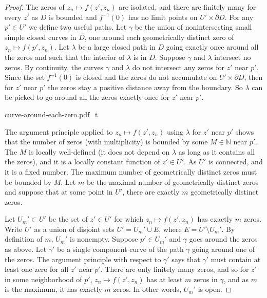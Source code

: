 \documentclass[12pt,openany]{book}
\newcommand{\N}{{\mathbb{N}}}
\theoremstyle{plain}
\theoremstyle{remark}
\theoremstyle{definition}
\newenvironment{myfig}{%
    \begin{center}
}{%
    \end{center}
}
\theoremstyle{exercise}
\theoremstyle{example}
\begin{document}
\begin{proof}
The zeros of $z_n \mapsto f(z',z_n)$ are isolated, and there are finitely
many for every $z'$ as $D$ is bounded and $f^{-1}(0)$ has no limit points on
$U' \times \partial D$.
For any $p' \in U'$ we define two useful paths.
Let $\gamma$ be the union of nonintersecting
small simple closed curves
in $D$, one around each geometrically distinct zero of $z_n \mapsto f(p',z_n)$.
Let $\lambda$ be a large closed path in $D$ going 
exactly once around all the zeros and such that the interior of $\lambda$ is
in $D$.  Suppose $\gamma$ and $\lambda$
intersect no zeros.
By continuity,
the curves $\gamma$
and $\lambda$ do not intersect any zeros for $z'$ near $p'$.
Since the set $f^{-1}(0)$ is closed and the zeros
do not
accumulate on $U' \times \partial D$,
then
for $z'$ near $p'$ the zeros stay a positive distance away from
the boundary.  So $\lambda$ can be picked to go 
around all
the zeros exactly once for $z'$ near $p'$.

\begin{myfig}
{curve-around-each-zero.pdf_t}
\end{myfig}

The argument principle applied to $z_n \mapsto f(z',z_n)$ using $\lambda$ for $z'$ near
$p'$ shows that the number of zeros (with multiplicity) is bounded by some $M \in \N$
near $p'$.  The $M$ is locally well-defined (it does not depend on $\lambda$ as
long as it contains all the zeros), and it is a locally constant function of
$z' \in U'$.
As $U'$ is connected, and it is a fixed number.  The maximum number of
geometrically distinct zeros must be bounded by $M$.  Let $m$ be the maximal
number of geometrically distinct zeros and suppose that at some point
in $U'$, there are exactly $m$ geometrically distinct zeros.

Let $U_m' \subset U'$ be the set of $z' \in U'$ for which $z_n \mapsto f(z',z_n)$
has exactly $m$ zeros.
Write $U'$ as a union of disjoint sets $U' = U_m' \cup E$, where $E = U'
\setminus U_m'$.
By definition of $m$, $U_m'$ is nonempty.  Suppose $p' \in U_m'$ and $\gamma$
goes around the zeros as above.  Let $\gamma'$ be a single component curve
of the path $\gamma$ going around one of the zeros.
The argument principle with respect to $\gamma'$ says that
$\gamma'$ must contain at least one zero for all $z'$ near $p'$.
There are only finitely many zeros, and so for $z'$ in 
some neighborhood of $p'$,
$z_n \mapsto f(z',z_n)$ has at least $m$
zeros in $\gamma$, and as $m$ is the maximum, it has exactly $m$ zeros.
In other words, $U_m'$ is open.


\end{proof}
\end{document}
